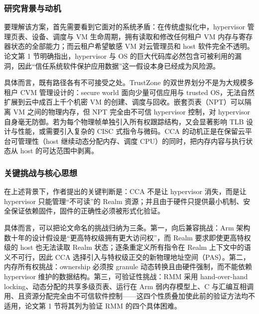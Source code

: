 \documentclass[11pt]{ctexart}
\begin{document}
\subsubsection{研究背景与动机}
要理解该方案，首先需要看到它面对的系统矛盾：在传统虚拟化中，hypervisor 管理页表、设备、调度与 VM 生命周期，拥有读取和修改任何租户 VM 内存与寄存器状态的全部能力；而云租户希望敏感 VM 对云管理员和 host 软件完全不透明。论文第 1 节明确指出，hypervisor 与 OS 的巨大代码库必然包含可被利用的漏洞，因此“信任系统软件保护应用数据”这一假设本身已经成为风险源。\par
具体而言，既有路径各有不可接受之处。TrustZone 的双世界划分不是为大规模多租户 CVM 管理设计的：secure world 面向少量可信应用与 trusted OS，无法自然扩展到云中成百上千个机密 VM 的创建、调度与回收。嵌套页表（NPT）可以隔离 VM 之间的物理内存，但 NPT 完全由不可信 hypervisor 控制，对 hypervisor 自身毫无防御。若为每个物理帧单独引入所有权跟踪结构，又会显著影响 TLB 设计与性能，或需要引入复杂的 CISC 式指令与微码。CCA 的动机正是在保留云平台可管理性（host 继续动态分配内存、调度 CPU）的同时，把内存内容与执行状态从 host 的可达范围中剥离。\par
\subsubsection{关键挑战与核心思想}
在上述背景下，作者提出的关键判断是：CCA 不是让 hypervisor 消失，而是让 hypervisor 只能管理“不可读”的 Realm 资源；并且由于硬件只提供最小机制、安全保证依赖固件，固件的正确性必须被形式化验证。\par
具体而言，可以把论文命名的挑战归纳为三条。第一，向后兼容挑战：Arm 架构数十年的设计假设是“更高特权级拥有更大访问权”，而 Realm 要求即使更高特权级的 host 也无法读取 Realm 状态；逐条重定义所有指令在 Realm 上下文中的语义不可行，因此 CCA 选择引入与特权级正交的新物理地址空间（PAS）。第二，内存所有权挑战：ownership 必须按 granule 动态转换且由硬件强制，而不能依赖 hypervisor 维护的数据结构。第三，可验证性挑战：RMM 采用 hand-over-hand locking、动态分配的共享多级页表、运行在 Arm 弱内存模型上、C 与汇编互相调用、且资源分配完全由不可信软件控制——这四个性质叠加使此前的验证方法均不适用，论文第 1 节将其列为验证 RMM 的四个具体困难。\par
\end{document}
